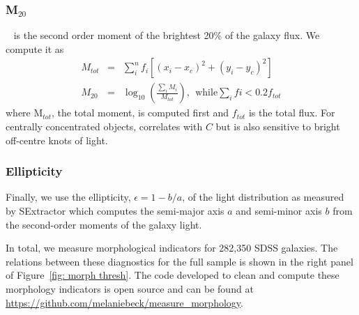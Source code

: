 \subsubsection{M$_{20}$}
~\citep{Lotz2004} is the second order moment of the brightest 20\% of the galaxy flux. We compute it as
\begin{eqnarray}
 M_{tot} & = & \sum_i^nf_i[(x_i-x_c)^2 + (y_i-y_c)^2]  \\
 M_{20} & = & \log_{10} (\frac{\sum_iM_i}{M_{tot}}), ~~\textrm{while} \sum_ifi < 0.2f_{tot}
\end{eqnarray}
where M$_{tot}$, the total moment, is computed first and $f_{tot}$ is the total flux. For centrally concentrated objects,  correlates with $C$ but is also sensitive to bright off-centre knots of light. 

\subsubsection{Ellipticity}
Finally, we use the ellipticity, $\epsilon = 1 - b/a$, of the light distribution as measured by SExtractor which computes the semi-major axis $a$ and semi-minor axis $b$ from the second-order moments of the galaxy light.  

In total, we measure morphological indicators for 282,350 SDSS galaxies. The relations between these diagnostics for the full sample is shown in the right panel of Figure~\ref{fig: morph thresh}. The code developed to clean and compute these morphology indicators is open source and can be found at \url{https://github.com/melaniebeck/measure_morphology}.



